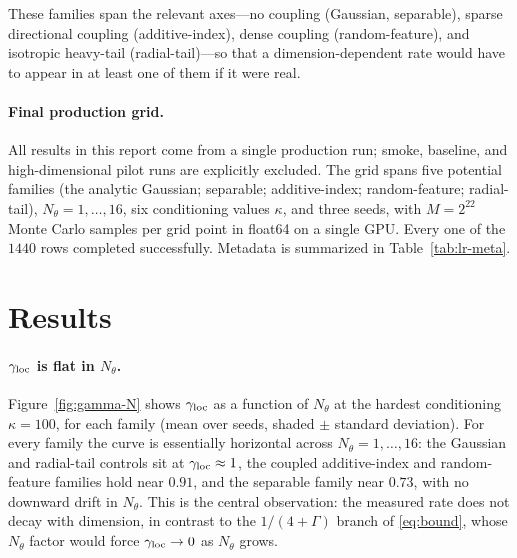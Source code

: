 \documentclass[11pt]{article}
\begin{document}
These families span the relevant axes---no coupling (Gaussian, separable),
sparse directional coupling (additive-index), dense coupling (random-feature),
and isotropic heavy-tail (radial-tail)---so that a dimension-dependent rate would
have to appear in at least one of them if it were real.

\paragraph{Final production grid.}
All results in this report come from a single production run; smoke, baseline,
and high-dimensional pilot runs are explicitly excluded. The grid spans five
potential families (the analytic Gaussian; separable; additive-index;
random-feature; radial-tail), $N_\theta=1,\dots,16$, six conditioning values
$\kappa$, and three seeds, with $M=2^{22}$ Monte Carlo samples per grid point in
float64 on a single GPU. Every one of the $1440$ rows completed successfully.
Metadata is summarized in Table~\ref{tab:lr-meta}.

\begin{table}[t]
\centering
\caption{Metadata of the final natural-gradient local-rate production run. This
is the only run interpreted as evidence; exploratory smoke/baseline/pilot runs
are excluded.}
\label{tab:lr-meta}
\end{table}

\section{Results}

\paragraph{$\gamma_{\mathrm{loc}}$ is flat in $N_\theta$.}
Figure~\ref{fig:gamma-N} shows $\gamma_{\mathrm{loc}}$ as a function of $N_\theta$ at the hardest
conditioning $\kappa=100$, for each family (mean over seeds, shaded
$\pm$ standard deviation). For every family the curve is essentially horizontal
across $N_\theta=1,\dots,16$: the Gaussian and radial-tail controls sit at
$\gamma_{\mathrm{loc}}\approx1$, the coupled additive-index and random-feature families hold near
$0.91$, and the separable family near $0.73$, with no downward drift in
$N_\theta$. This is the central observation: the measured rate does not decay
with dimension, in contrast to the $1/(4+\Gamma)$ branch of \eqref{eq:bound},
whose $N_\theta$ factor would force $\gamma_{\mathrm{loc}}\to0$ as $N_\theta$ grows.
\end{document}
